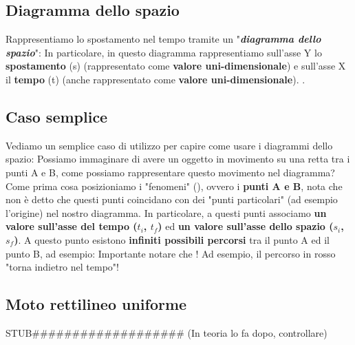 	\subsection{Diagramma dello spazio}
		Rappresentiamo lo spostamento nel tempo tramite un "\textit{\textbf{diagramma dello spazio}}":
		In particolare, in questo diagramma rappresentiamo sull'asse Y lo \textbf{spostamento} (s) (rappresentato come \textbf{valore uni-dimensionale}) e sull'asse X il \textbf{tempo} (t) (anche rappresentato come \textbf{valore uni-dimensionale}). .

	\subsection{Caso semplice}
		Vediamo un semplice caso di utilizzo per capire come usare i diagrammi dello spazio:
		Possiamo immaginare di avere un oggetto in movimento su una retta tra i punti A e B, come possiamo rappresentare questo movimento nel diagramma? Come prima cosa posizioniamo i "fenomeni" (), ovvero i \textbf{punti A e B}, nota che non è detto che questi punti coincidano con dei "punti particolari" (ad esempio l'origine) nel nostro diagramma. In particolare, a questi punti associamo \textbf{un valore sull'asse del tempo ($t_i$, $t_f$)} ed \textbf{un valore sull'asse dello spazio ($s_i$, $s_f$)}.
		A questo punto esistono \textbf{infiniti possibili percorsi} tra il punto A ed il punto B, ad esempio:
		Importante notare che ! Ad esempio, il percorso in rosso "torna indietro nel tempo"!

	\subsection{Moto rettilineo uniforme}
		STUB\#\#\#\#\#\#\#\#\#\#\#\#\#\#\#\#\#\#\# (In teoria lo fa dopo, controllare)

